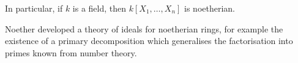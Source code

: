 In particular, if $k$ is a field, then $k[X_1, \ldots, X_n]$ is noetherian.

Noether developed a theory of ideals for noetherian rings, for example the
existence of a primary decomposition which generalises the factorisation into
primes known from number theory.
